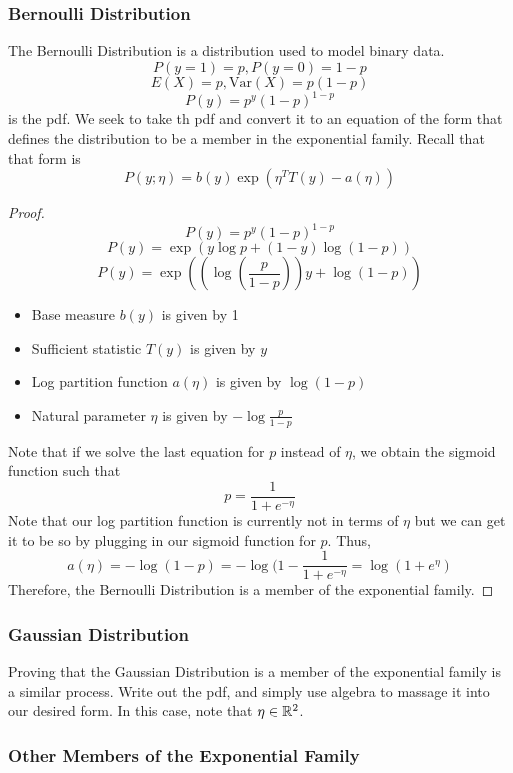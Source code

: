 \documentclass[12pt]{scrartcl}
\begin{document}
\subsubsection{Bernoulli Distribution}

The Bernoulli Distribution is a distribution used to model binary data.
\[P(y = 1) = p, P(y = 0) = 1 - p\]
\[E(X) = p, \text{Var}(X) = p(1-p)\]
\[P(y) = p^y(1-p)^{1-p}\]
is the pdf. We seek to take th pdf and convert it to an equation of the form that defines the distribution to be a member in the exponential family. Recall that that form is 
\[P(y; \eta) = b(y)\exp(\eta^TT(y) - a(\eta))\]
\begin{proof}
\[P(y) = p^y(1-p)^{1-p}\]
\[P(y) = \exp(y\log p + (1-y)\log(1-p))\]
\[P(y) = \exp((\log(\frac{p}{1-p}))y + \log(1-p))\]
\begin{itemize}
    \item Base measure $b(y)$ is given by 1
    \item Sufficient statistic $T(y)$ is given by $y$
    \item Log partition function $a(\eta)$ is given by $\log (1-p)$
    \item Natural parameter $\eta$ is given by $-\log \frac{p}{1-p}$
\end{itemize}
Note that if we solve the last equation for $p$ instead of $\eta$, we obtain the sigmoid function such that 
\[p = \frac{1}{1 + e^{-\eta}}\]
Note that our log partition function is currently not in terms of $\eta$ but we can get it to be so by plugging in our sigmoid function for $p$. Thus, 
\[a(\eta) = -\log(1-p) = -\log(1-\frac{1}{1 + e^{-\eta}} = \log(1+ e^\eta)\]
Therefore, the Bernoulli Distribution is a member of the exponential family.
\end{proof}

\subsubsection{Gaussian Distribution}

Proving that the Gaussian Distribution is a member of the exponential family is a similar process. Write out the pdf, and simply use algebra to massage it into our desired form. In this case, note that $\eta \in \mathbb R^2$.

\subsubsection{Other Members of the Exponential Family}
\end{document}
